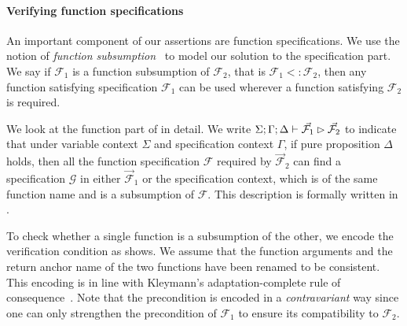 \paragraph{Verifying function specifications} An important component of our assertions are function specifications. We use the notion of \emph{function subsumption}~\cite{Andrew2021Subsumption} to model our solution to the specification part. We say if $\mathcal{F}_1$ is a function subsumption of $\mathcal{F}_2$, that is $\mathcal{F}_1 <: \mathcal{F}_2$, then any function satisfying specification $\mathcal{F}_1$ can be used wherever a function satisfying $\mathcal{F}_2$ is required.

We look at the function part of  in detail. We write $\Sigma; \Gamma; \Delta \vdash \vec{\mathcal{F}_1} \rhd \vec{\mathcal{F}_2}$ to indicate that under variable context $\Sigma$ and specification context $\Gamma$, if pure proposition $\Delta$ holds, then all the function specification $\mathcal{F}$ required by $\vec{\mathcal{F}}_2$ can find a specification $\mathcal{G}$ in either $\vec{\mathcal{F}}_1$ or the specification context, which is of the same function name and is a subsumption of $\mathcal{F}$. This description is formally written in .


To check whether a single function is a subsumption of the other, we encode the verification condition as  shows. We assume that the function arguments and the return anchor name of the two functions have been renamed to be consistent. This encoding is in line with Kleymann’s adaptation-complete
rule of consequence~\cite{Kleymann1999HoareAux}. Note that the precondition is encoded in a \emph{contravariant} way since one can only strengthen the precondition of $\mathcal{F}_1$ to ensure its compatibility to  $\mathcal{F}_2$.



